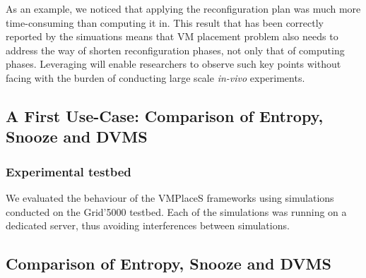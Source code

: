 As an example, we noticed that applying the
reconfiguration plan was much more time-consuming than computing it
in. This result that has been correctly reported by the simuations means that VM placement problem also needs
to address the way of shorten reconfiguration phases, not only that of
computing phases.
Leveraging \vmps will enable researchers to observe such key points
without facing with the burden of conducting large scale
\textit{in-vivo} experiments.

\subsection{A First Use-Case:  Comparison of Entropy, Snooze and DVMS}


\subsubsection{Experimental testbed}

We evaluated the behaviour of the VMPlaceS frameworks using simulations 
conducted on the Grid'5000 testbed. Each of the simulations was running on a
dedicated server, thus avoiding interferences between simulations.



\subsection{Comparison of Entropy, Snooze and DVMS}

